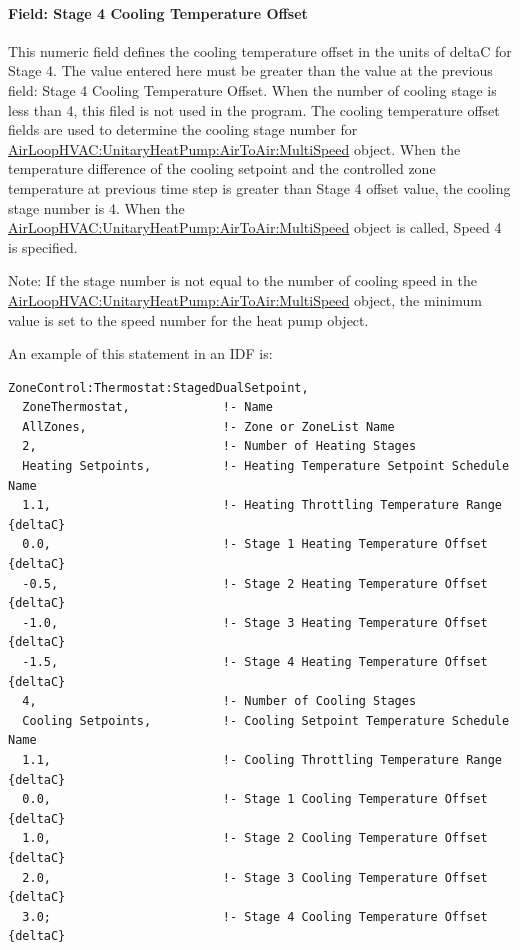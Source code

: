 \paragraph{Field: Stage 4 Cooling Temperature Offset}\label{field-stage-4-cooling-temperature-offset}

This numeric field defines the cooling temperature offset in the units of deltaC for Stage 4. The value entered here must be greater than the value at the previous field: Stage 4 Cooling Temperature Offset. When the number of cooling stage is less than 4, this filed is not used in the program. The cooling temperature offset fields are used to determine the cooling stage number for \hyperref[airloophvacunitaryheatpumpairtoairmultispeed]{AirLoopHVAC:UnitaryHeatPump:AirToAir:MultiSpeed} object. When the temperature difference of the cooling setpoint and the controlled zone temperature at previous time step is greater than Stage 4 offset value, the cooling stage number is 4. When the \hyperref[airloophvacunitaryheatpumpairtoairmultispeed]{AirLoopHVAC:UnitaryHeatPump:AirToAir:MultiSpeed} object is called, Speed 4 is specified.

Note: If the stage number is not equal to the number of cooling speed in the \hyperref[airloophvacunitaryheatpumpairtoairmultispeed]{AirLoopHVAC:UnitaryHeatPump:AirToAir:MultiSpeed} object, the minimum value is set to the speed number for the heat pump object.

An example of this statement in an IDF is:

\begin{lstlisting}
ZoneControl:Thermostat:StagedDualSetpoint,
  ZoneThermostat,             !- Name
  AllZones,                   !- Zone or ZoneList Name
  2,                          !- Number of Heating Stages
  Heating Setpoints,          !- Heating Temperature Setpoint Schedule Name
  1.1,                        !- Heating Throttling Temperature Range {deltaC}
  0.0,                        !- Stage 1 Heating Temperature Offset {deltaC}
  -0.5,                       !- Stage 2 Heating Temperature Offset {deltaC}
  -1.0,                       !- Stage 3 Heating Temperature Offset {deltaC}
  -1.5,                       !- Stage 4 Heating Temperature Offset {deltaC}
  4,                          !- Number of Cooling Stages
  Cooling Setpoints,          !- Cooling Setpoint Temperature Schedule Name
  1.1,                        !- Cooling Throttling Temperature Range {deltaC}
  0.0,                        !- Stage 1 Cooling Temperature Offset {deltaC}
  1.0,                        !- Stage 2 Cooling Temperature Offset {deltaC}
  2.0,                        !- Stage 3 Cooling Temperature Offset {deltaC}
  3.0;                        !- Stage 4 Cooling Temperature Offset {deltaC}
\end{lstlisting}

